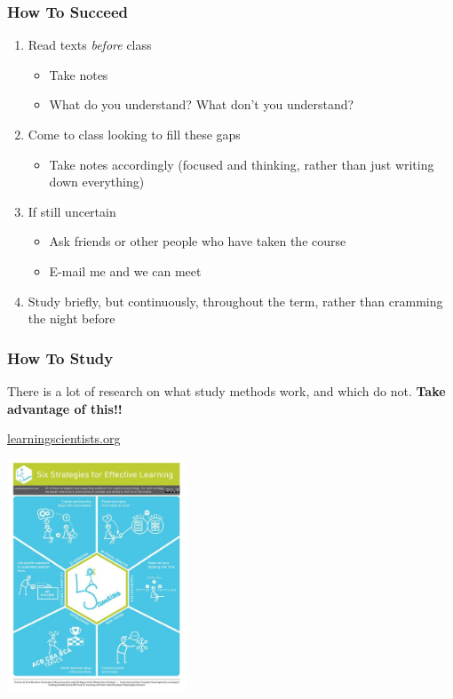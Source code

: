 \documentclass[10pt]{beamer}
\begin{document}
\begin{frame}[t]
\frametitle{How To Succeed}
\vspace{0.5cm}

	\begin{enumerate}
		\item Read texts \emph{before} class
			\begin{itemize}
				\item Take notes
				\item What do you understand? What don't you understand?
			\end{itemize}
		
		\medskip	
		\item Come to class looking to fill these gaps
			\begin{itemize}
				\item Take notes accordingly (focused and thinking, rather than just writing down everything)
			\end{itemize}	
		\medskip	
		\item If still uncertain
			\begin{itemize}
				\item Ask friends or other people who have taken the course
				\item E-mail me and we can meet
			\end{itemize}	
		\medskip	
		\item Study briefly, but continuously, throughout the term, rather than cramming the night before	
	\end{enumerate}
\end{frame}


\begin{frame}[t]
\frametitle{How To Study}
\vspace{0.5cm}
There is a lot of research on what study methods work, and which do not. \textbf{Take advantage of this!!}

	\begin{center}
		\href{http://www.learningscientists.org/videos}{\textcolor{myblue}{learningscientists.org}}
		
		\vspace{0.5cm}
		
		\includegraphics[width=0.4\textwidth]{figures/learning.jpg}
	\end{center}
\end{frame}
\end{document}
